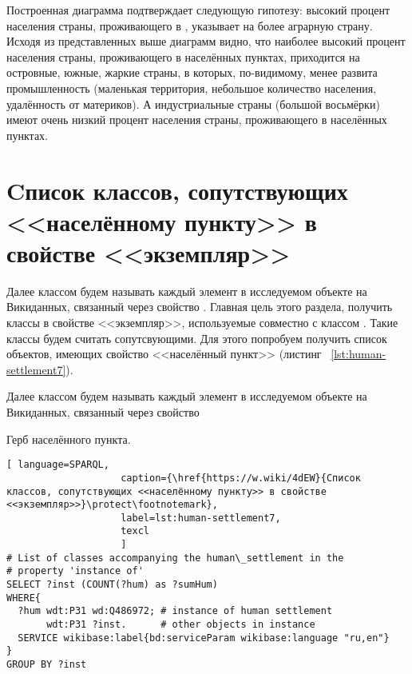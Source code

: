 Построенная диаграмма подтверждает следующую гипотезу: высокий процент населения страны, проживающего в , указывает на более аграрную страну. Исходя из представленных выше диаграмм видно, что наиболее высокий процент населения страны, проживающего в населённых пунктах, приходится на островные, южные, жаркие страны, в которых, по-видимому, менее развита промышленность (маленькая территория, небольшое количество населения, удалённость от материков). А индустриальные страны (большой восьмёрки) имеют очень низкий процент населения страны, проживающего в населённых пунктах.

\section{Cписок классов, сопутствующих <<населённому пункту>> в свойстве <<экземпляр>>}
\label{human-settlement:tag1}

Далее классом будем называть каждый элемент в исследуемом объекте на Викиданных, связанный через свойство . Главная цель этого раздела, получить классы в свойстве <<экземпляр>>, используемые совместно с классом . Такие классы будем считать сопутсвующими. Для этого попробуем получить список объектов, имеющих свойство <<населённый пункт>> (листинг ~\protect\ref{lst:human-settlement7}).

Далее классом будем называть каждый элемент в исследуемом объекте на Викиданных, связанный через свойство 

\begin{marginfigure}[0.0cm]
{
\setlength{\fboxsep}{0pt}%
\setlength{\fboxrule}{1pt}%
%
}
  \caption{Герб населённого пункта.}%
  \label{fig:flag_question_human_settlements5}%
\end{marginfigure}


\begin{lstlisting}[ language=SPARQL, 
                    caption={\href{https://w.wiki/4dEW}{Cписок классов, сопутствующих <<населённому пункту>> в свойстве <<экземпляр>>}\protect\footnotemark},
                    label=lst:human-settlement7,
                    texcl 
                    ]
# List of classes accompanying the human\_settlement in the
# property 'instance of'
SELECT ?inst (COUNT(?hum) as ?sumHum) 
WHERE{          
  ?hum wdt:P31 wd:Q486972; # instance of human settlement
       wdt:P31 ?inst.      # other objects in instance
  SERVICE wikibase:label{bd:serviceParam wikibase:language "ru,en"}
}  
GROUP BY ?inst
\end{lstlisting}%

